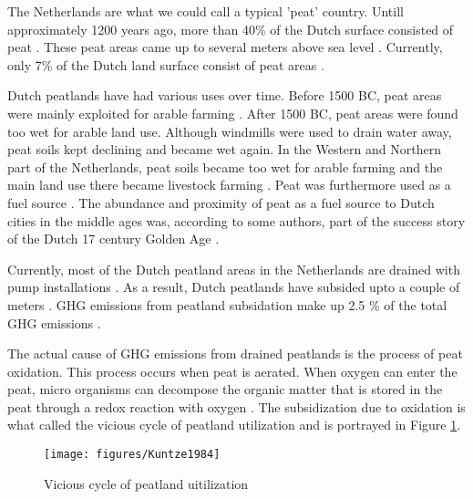 The Netherlands are what we could call a typical 'peat' country. Untill approximately 1200 years ago, more than 40\% of the Dutch surface consisted of peat \citep{vos2015origin, de2008vergeten}. These peat areas came up to several meters above sea level \citep{de2008vergeten}. Currently, only 7\% of the Dutch land surface consist of peat areas \citep{de2004verbreiding}. 

Dutch peatlands have had various uses over time. Before 1500 BC, peat areas were mainly exploited for arable farming \citep{ettema2005boeren}. After 1500 BC, peat areas were found too wet for arable land use. Although windmills were used to drain water away, peat soils kept declining and became wet again. In the Western and Northern part of the Netherlands, peat soils became too wet for arable farming and the main land use there became livestock farming \citep{brouns2016effects}. Peat was furthermore used as a fuel source \citep{van1996turfwinning}. The abundance and proximity of peat as a fuel source to Dutch cities in the middle ages was, according to some authors, part of the success story of the Dutch 17 century Golden Age \citep{de1978peat}.

Currently, most of the Dutch peatland areas in the Netherlands are drained with pump installations \citep{brouns2016effects}. As a result, Dutch peatlands have subsided upto a couple of meters \citep{de2008vergeten}. \ac{GHG} emissions from peatland subsidation make up 2.5 \% of the total GHG emissions \citep{van2010emission}. 

The actual cause of \ac{GHG} emissions from drained peatlands is the process of peat oxidation. This process occurs when peat is aerated. When oxygen can enter the peat, micro organisms can decompose the organic matter that is stored in the peat through a redox reaction with oxygen \citep{erkens2016double}. The subsidization due to oxidation is what \citet{kuntze1984bewirtschaftung} called the vicious cycle of peatland utilization and is portrayed in Figure \ref{fig:peatlanduti}.

\begin{figure}
    \centering
    \texttt{[image: figures/Kuntze1984]} 
    \caption{Vicious cycle of peatland uitilization}
    \label{fig:peatlanduti}
\end{figure}


